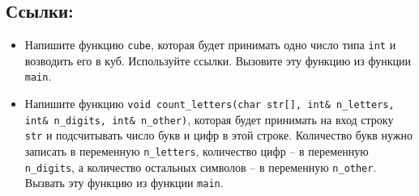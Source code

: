 \documentclass{article}
\begin{document}
\subsection*{Ссылки:}
\begin{itemize}
\item Напишите функцию \texttt{cube}, которая будет принимать одно число типа \texttt{int} и возводить его в куб. Используйте ссылки. Вызовите эту функцию из функции \texttt{main}.
\item Напишите функцию \texttt{void count\_letters(char str[], int\& n\_letters, int\& n\_digits, int\& n\_other)}, которая будет принимать на вход строку \texttt{str} и подсчитывать число букв и цифр в этой строке. Количество букв нужно записать в переменную \texttt{n\_letters}, количество цифр -- в переменную \texttt{n\_digits}, а количество остальных символов -- в переменную \texttt{n\_other}. Вызвать эту функцию из функции \texttt{main}.
\end{itemize}
\end{document}
